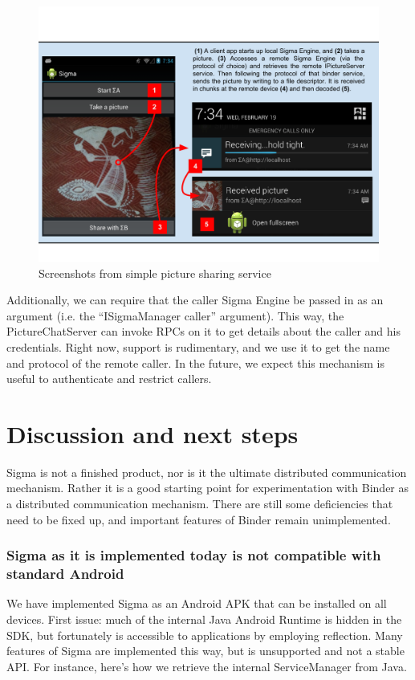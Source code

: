 \documentclass[prodmode]{acmlarge}
\begin{document}
\begin{figure}[h]
\centering
\includegraphics[width=\textwidth]{drawings/PictureChatExample.pdf}
\caption{Screenshots from simple picture sharing service}
\label{fig:ExampleApplication}
\end{figure}

Additionally, we can require that the caller Sigma Engine be passed in as an argument (i.e. the ``ISigmaManager caller'' argument). This way, the PictureChatServer can invoke RPCs on it to get details about the caller and his credentials. Right now, support is rudimentary, and we use it to get the name and protocol of the remote caller. In the future, we expect this mechanism is useful to authenticate and restrict callers.

\section{Discussion and next steps}
\label{sec:Discussion}
Sigma is not a finished product, nor is it the ultimate distributed communication mechanism. Rather it is a good starting point for experimentation with Binder as a distributed communication mechanism. There are still some deficiencies that need to be fixed up, and important features of Binder remain unimplemented.

\subsubsection{Sigma as it is implemented today is not compatible with standard Android}
We have implemented Sigma as an Android APK that can be installed on all devices. First issue: much of the internal Java Android Runtime is hidden in the SDK, but fortunately is accessible to applications by employing reflection. Many features of Sigma are implemented this way, but is unsupported and not a stable API. For instance, here's how we retrieve the internal ServiceManager from Java.
\end{document}
